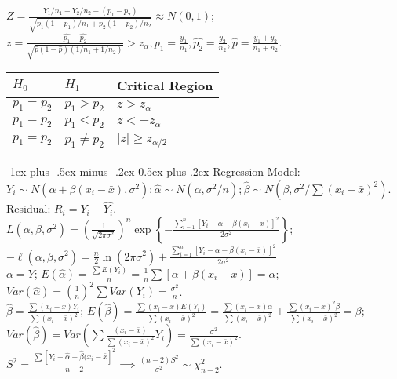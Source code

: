 \documentclass[10pt,landscape]{article}
\makeatletter
\renewcommand{\subsection}{\@startsection{subsection}{2}{0mm}%
                                {-1ex plus -.5ex minus -.2ex}%
                                {0.5ex plus .2ex}%
                                {\normalfont\small\bfseries}}
\makeatother
\begin{document}
\begin{multicols}{3}
$Z=\frac{Y_1/n_1-Y_2/n_2-(p_1-p_2)}{\sqrt{p_1(1-p_1)/n_1+p_2(1-p_2)/n_2} }\approx N(0,1)$;
$z=\frac{\hat{p_1}-\hat{p_2} }{\sqrt{\hat{p}(1-\hat{p})(1/n_1+1/n_2)} } > z_\alpha, \hat{p_1} = \frac{y_1}{n_1}, \hat{p_2} = \frac{y_2}{n_2}, \hat{p} = \frac{y_1+y_2}{n_1+n_2}$.\\
\begin{tabular}{|l|l|l|}\hline
$H_0$ & $H_1$ & Critical Region\\\hline
$p_1=p_2$&$p_1>p_2$& $z> z_\alpha$\\\hline
$p_1=p_2$&$p_1<p_2$& $z < -z_\alpha$\\ \hline
$p_1=p_2$&$p_1\neq p_2$& $|z|\ge z_{\alpha/2}$\\ \hline
\end{tabular}


\subsection{Regression}
Model: $Y_i \sim N (\alpha + \beta (x_i-\bar{x}), \sigma^2); \hat\alpha\sim N(\alpha, \sigma^2/n); \hat\beta\sim N(\beta, \sigma^2/\sum(x_i-\bar{x})^2).$\\
Residual: $R_i =  Y_i - \hat{Y_i}$.\\

$L(\alpha, \beta, \sigma^2) = \left(\frac{1}{\sqrt{2\pi\sigma^2} }\right)^n\exp\left\{-\frac{\sum_{i=1}^n[Y_i-\alpha-\beta(x_i-\bar{x})]^2}{2\sigma^2}\right\}$;\\
$-\ell(\alpha, \beta, \sigma^2) = \frac{n}{2} \ln (2\pi\sigma^2)  +\frac{\sum_{i=1}^n[Y_i-\alpha-\beta(x_i-\bar{x})]^2}{2\sigma^2}$\\

$\alpha=\bar{Y}$;
$E(\hat\alpha)=\frac{\sum E(Y_i)}{n} = \frac{1}{n}\sum[\alpha+\beta(x_i-\bar{x})] = \alpha$;
$Var(\hat\alpha)=(\frac{1}{n})^2\sum Var(Y_i) = \frac{\sigma^2}{n}$.\\

$\hat\beta = \frac{\sum(x_i-\bar{x})Y_i}{\sum(x_i-\bar{x})^2}$;
$E(\hat\beta) = \frac{\sum(x_i-\bar{x})E(Y_i)}{\sum(x_i-\bar{x})^2} = \frac{\sum(x_i-\bar{x})\alpha}{\sum(x_i-\bar{x})^2}+\frac{\sum(x_i-\bar{x})^2\beta}{\sum(x_i-\bar{x})^2} = \beta$;
$Var(\hat\beta) = Var\left(\sum\frac{(x_i-\bar{x})}{\sum(x_i-\bar{x})^2}Y_i \right)= \frac{\sigma^2}{\sum(x_i-\bar{x})^2}.$\\

$S^2=\frac{\sum[Y_i-\hat\alpha-\hat\beta(x_i-\bar{x}]^2}{n-2} \implies \frac{(n-2)S^2}{\sigma^2}\sim\chi^2_{n-2}$.\\


\end{multicols}
\end{document}
